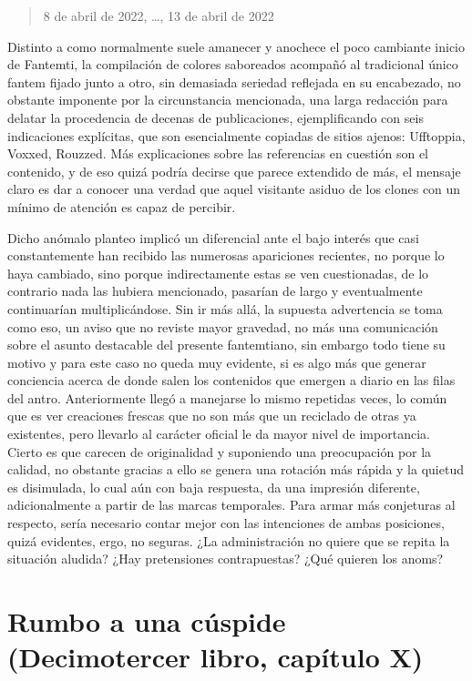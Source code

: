 \documentclass[
]{book}
\begin{document}
\begin{quote}
8 de abril de 2022, \ldots, 13 de abril de 2022
\end{quote}

Distinto a como normalmente suele amanecer y anochece el poco cambiante inicio de Fantemti, la compilación de colores saboreados acompañó al tradicional único fantem fijado junto a otro, sin demasiada seriedad reflejada en su encabezado, no obstante imponente por la circunstancia mencionada, una larga redacción para delatar la procedencia de decenas de publicaciones, ejemplificando con seis indicaciones explícitas, que son esencialmente copiadas de sitios ajenos: Ufftoppia, Voxxed, Rouzzed. Más explicaciones sobre las referencias en cuestión son el contenido, y de eso quizá podría decirse que parece extendido de más, el mensaje claro es dar a conocer una verdad que aquel visitante asiduo de los clones con un mínimo de atención es capaz de percibir.

Dicho anómalo planteo implicó un diferencial ante el bajo interés que casi constantemente han recibido las numerosas apariciones recientes, no porque lo haya cambiado, sino porque indirectamente estas se ven cuestionadas, de lo contrario nada las hubiera mencionado, pasarían de largo y eventualmente continuarían multiplicándose. Sin ir más allá, la supuesta advertencia se toma como eso, un aviso que no reviste mayor gravedad, no más una comunicación sobre el asunto destacable del presente fantemtiano, sin embargo todo tiene su motivo y para este caso no queda muy evidente, si es algo más que generar conciencia acerca de donde salen los contenidos que emergen a diario en las filas del antro. Anteriormente llegó a manejarse lo mismo repetidas veces, lo común que es ver creaciones frescas que no son más que un reciclado de otras ya existentes, pero llevarlo al carácter oficial le da mayor nivel de importancia. Cierto es que carecen de originalidad y suponiendo una preocupación por la calidad, no obstante gracias a ello se genera una rotación más rápida y la quietud es disimulada, lo cual aún con baja respuesta, da una impresión diferente, adicionalmente a partir de las marcas temporales. Para armar más conjeturas al respecto, sería necesario contar mejor con las intenciones de ambas posiciones, quizá evidentes, ergo, no seguras. ¿La administración no quiere que se repita la situación aludida? ¿Hay pretensiones contrapuestas? ¿Qué quieren los anoms?

\hypertarget{rumbo-a-una-cuxfaspide-decimotercer-libro-capuxedtulo-x}{%
\section{Rumbo a una cúspide (Decimotercer libro, capítulo X)}\label{rumbo-a-una-cuxfaspide-decimotercer-libro-capuxedtulo-x}}
\end{document}
